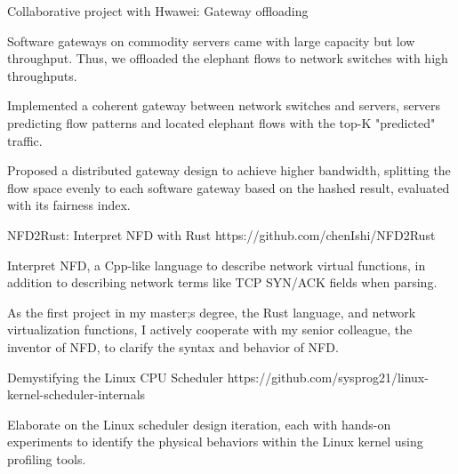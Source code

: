 \begin{cventries}
      \vspace{-3mm}
  
      \cventry
        {} %
        {Collaborative project with Hwawei: Gateway offloading} %
        {} %
        {} %
        {
          \vspace{-2mm}
          \begin{cvitems} %
            \item {Software gateways on commodity servers came with large capacity but low throughput. Thus, we offloaded the elephant flows to network switches with high throughputs.}
            \item {Implemented a coherent gateway between network switches and servers, servers predicting flow patterns and located elephant flows with the top-K "predicted" traffic.}
            \item {Proposed a distributed gateway design to achieve higher bandwidth, splitting the flow space evenly to each software gateway based on the hashed result, evaluated with its fairness index.}
          \end{cvitems}
        }

        \vspace{-3mm}
  
        \cventry
          {} %
          {NFD2Rust: Interpret NFD with Rust} %
          {} %
          {https://github.com/chenIshi/NFD2Rust} %
          {
            \vspace{-2mm}
            \begin{cvitems} %
              \item {Interpret NFD, a Cpp-like language to describe network virtual functions, in addition to describing network terms like TCP SYN/ACK fields when parsing.}
              \item {As the first project in my master;s degree, the Rust language, and network virtualization functions, I actively cooperate with my senior colleague, the inventor of NFD, to clarify the syntax and behavior of NFD.}
            \end{cvitems}
          }

        \vspace{-3mm}
  
        \cventry
          {} %
          {Demystifying the Linux CPU Scheduler} %
          {} %
          {https://github.com/sysprog21/linux-kernel-scheduler-internals} %
          {
            \vspace{-2mm}
            \begin{cvitems} %
              \item {Elaborate on the Linux scheduler design iteration, each with hands-on experiments to identify the physical behaviors within the Linux kernel using profiling tools.}
            \end{cvitems}
          }

\end{cventries}
